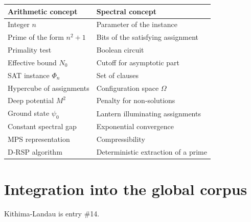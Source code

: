 \documentclass[11pt,a4paper]{article}
\begin{document}
\begin{center}
\small
\begin{tabular}{@{}l|l@{}}
\toprule
\textbf{Arithmetic concept} & \textbf{Spectral concept} \\
\midrule
Integer $n$ & Parameter of the instance \\
Prime of the form $n^2+1$ & Bits of the satisfying assignment \\
Primality test & Boolean circuit \\
Effective bound $N_0$ & Cutoff for asymptotic part \\
SAT instance $\Phi_n$ & Set of clauses \\
Hypercube of assignments & Configuration space $\Omega$ \\
Deep potential $M^2$ & Penalty for non‑solutions \\
Ground state $\psi_0$ & Lantern illuminating assignments \\
Constant spectral gap & Exponential convergence \\
MPS representation & Compressibility \\
D‑RSP algorithm & Deterministic extraction of a prime \\
\bottomrule
\end{tabular}
\end{center}

\section{Integration into the global corpus}

Kithima‑Landau is entry \#14.
\end{document}
